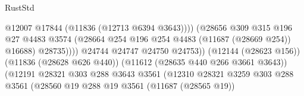 \begin{lexlean}{RustStd}
\begin{coremodule}
                                                          @12007
                                                          @17844
                                                          (@11836 (@12713 @6394 @3643))))
                                                      (@28656
                                                        @309
                                                        @315
                                                        @196
                                                        @27
                                                        @4483
                                                        @3574
                                                        (@28664
                                                          @254
                                                          @196
                                                          @254
                                                          @4483
                                                          (@11687 (@28669 @254))
                                                          @16688)
                                                        @28735))))
                                                @24744
                                                @24747
                                                @24750
                                                @24753))
                                            (@12144 (@28623 @156))
                                            (@11836 (@28628 @626 @440))
                                            (@11612 (@28635 @440 @266 @3661 @3643))
                                            (@12191
                                              @28321
                                              @303
                                              @288
                                              @3643
                                              @3561
                                              (@12310
                                                @28321
                                                @3259
                                                @303
                                                @288
                                                @3561
                                                (@28560
                                                  @19
                                                  @288
                                                  @19
                                                  @3561
                                                  (@11687 (@28565 @19))

\end{coremodule}
\end{lexlean}
